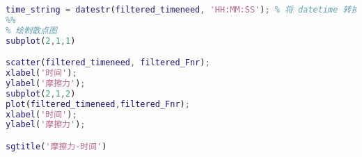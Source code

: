 \documentclass[withoutpreface,bwprint]{cumcmthesis} %
\begin{document}
\begin{appendices}
\begin{lstlisting}[language=matlab]
time_string = datestr(filtered_timeneed, 'HH:MM:SS'); % 将 datetime 转换为字符串格式 HH:mm:ss
%%
% 绘制散点图
subplot(2,1,1)

scatter(filtered_timeneed, filtered_Fnr);
xlabel('时间');
ylabel('摩擦力');
subplot(2,1,2)
plot(filtered_timeneed,filtered_Fnr);
xlabel('时间');
ylabel('摩擦力');

sgtitle('摩擦力-时间')
 \end{lstlisting}
 
\end{appendices}
\end{document}
